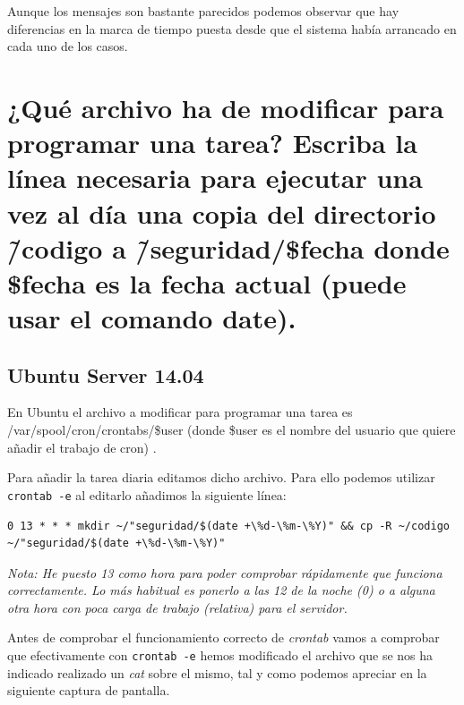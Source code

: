 Aunque los mensajes son bastante parecidos podemos observar que hay diferencias en la marca de tiempo puesta desde que el sistema había arrancado en cada uno de los casos. 



\section{¿Qué archivo ha de modificar para programar una tarea? Escriba la línea necesaria para ejecutar una vez al día una copia del directorio \~/codigo a \~/seguridad/\$fecha donde \$fecha es la fecha actual (puede usar el comando date).}

\subsection{Ubuntu Server 14.04}
En Ubuntu el archivo a modificar para programar una tarea es /var/spool/cron/crontabs/\$user (donde \$user es el nombre del usuario que quiere añadir el trabajo de cron) \cite{c2a}.

Para añadir la tarea diaria editamos dicho archivo. Para ello podemos utilizar \verb|crontab -e|\cite{c2a1} al editarlo añadimos la siguiente línea:\linebreak
\begin{verbatim}
0 13 * * * mkdir ~/"seguridad/$(date +\%d-\%m-\%Y)" && cp -R ~/codigo 
~/"seguridad/$(date +\%d-\%m-\%Y)"
\end{verbatim}

\textit{Nota: He puesto 13 como hora para poder comprobar rápidamente que funciona correctamente. Lo más habitual es ponerlo a las 12 de la noche (0) o a alguna otra hora con poca carga de trabajo (relativa) para el servidor.}
\linebreak\linebreak

Antes de comprobar el funcionamiento correcto de \textit{crontab} vamos a comprobar que efectivamente con \verb|crontab -e| hemos modificado el archivo que se nos ha indicado realizado un \textit{cat} sobre el mismo, tal y como podemos apreciar en la siguiente captura de pantalla.

